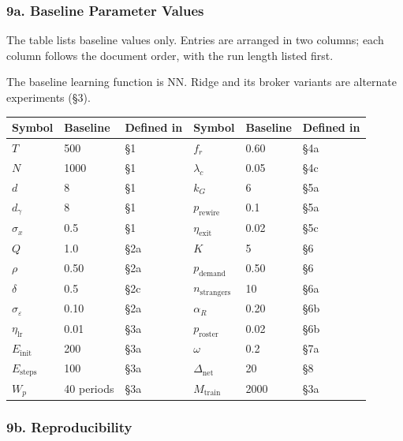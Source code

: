 \documentclass[11pt]{article}
\begin{document}
\subsubsection{9a. Baseline Parameter Values}\label{a.-baseline-parameter-values}

The table lists baseline values only. Entries are arranged in two columns; each column follows the document order, with the run length listed first.

The baseline learning function is NN. Ridge and its broker variants are alternate experiments (§3).

{
\begin{center}
\small
\setlength{\tabcolsep}{3pt}
\begin{tabular}{@{}lll@{\hspace{1.6em}}lll@{}}
\toprule
Symbol & Baseline & Defined in & Symbol & Baseline & Defined in \\
\midrule
\(T\) & 500 & §1 & \(f_r\) & 0.60 & §4a \\
\(N\) & 1000 & §1 & \(\lambda_c\) & 0.05 & §4c \\
\(d\) & 8 & §1 & \(k_G\) & 6 & §5a \\
\(d_\gamma\) & 8 & §1 & \(p_{\text{rewire}}\) & 0.1 & §5a \\
\(\sigma_x\) & 0.5 & §1 & \(\eta_{\mathrm{exit}}\) & 0.02 & §5c \\
\(Q\) & 1.0 & §2a & \(K\) & 5 & §6 \\
\(\rho\) & 0.50 & §2a & \(p_{\text{demand}}\) & 0.50 & §6 \\
\(\delta\) & 0.5 & §2c & \(n_{\mathrm{strangers}}\) & 10 & §6a \\
\(\sigma_\varepsilon\) & 0.10 & §2a & \(\alpha_R\) & 0.20 & §6b \\
\(\eta_{\mathrm{lr}}\) & 0.01 & §3a & \(p_{\text{roster}}\) & 0.02 & §6b \\
\(E_{\text{init}}\) & 200 & §3a & \(\omega\) & 0.2 & §7a \\
\(E_{\text{steps}}\) & 100 & §3a & \(\Delta_{\mathrm{net}}\) & 20 & §8 \\
\(W_p\) & 40 periods & §3a & \(M_{\text{train}}\) & 2000 & §3a \\
\bottomrule
\end{tabular}
\end{center}
}

\subsubsection{9b. Reproducibility}\label{b.-reproducibility}
\end{document}
